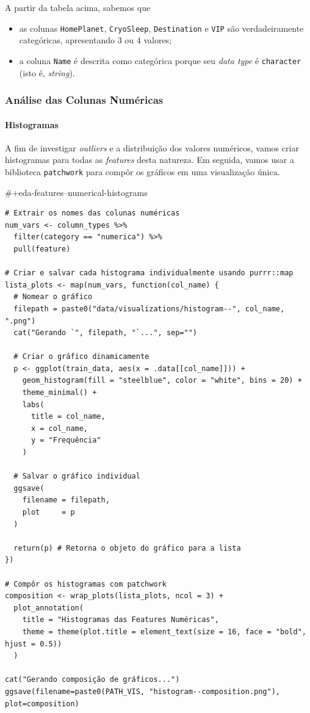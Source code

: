 \documentclass[12pt,a4paper]{article}
\begin{document}
A partir da tabela acima, sabemos que
\begin{itemize}
\item as colunas \texttt{HomePlanet}, \texttt{CryoSleep}, \texttt{Destination} e \texttt{VIP} são verdadeiramente categóricas, apresentando \(3\) ou \(4\) valores;
\item a coluna \texttt{Name} é descrita como categórica porque seu \emph{data type} é \texttt{character} (isto é, \emph{string}).
\end{itemize}
\subsubsection{Análise das Colunas Numéricas}
\label{sec:orgc41321d}
\paragraph{Histogramas}
\label{sec:orgdb3da68}
A fim de investigar \emph{outliers} e a distribuição dos valores numéricos, vamos criar histogramas para todas as \emph{features} desta natureza. Em seguida, vamos usar a biblioteca \texttt{patchwork} para compôr os gráficos em uma visualização única.

\#+eda-features--numerical-histograms
\begin{verbatim}
# Extrair os nomes das colunas numéricas
num_vars <- column_types %>% 
  filter(category == "numerica") %>% 
  pull(feature)

# Criar e salvar cada histograma individualmente usando purrr::map
lista_plots <- map(num_vars, function(col_name) {
  # Nomear o gráfico
  filepath = paste0("data/visualizations/histogram--", col_name, ".png")
  cat("Gerando `", filepath, "`...", sep="")

  # Criar o gráfico dinamicamente
  p <- ggplot(train_data, aes(x = .data[[col_name]])) +
    geom_histogram(fill = "steelblue", color = "white", bins = 20) +
    theme_minimal() +
    labs(
      title = col_name,
      x = col_name,
      y = "Frequência"
    )

  # Salvar o gráfico individual
  ggsave(
    filename = filepath,
    plot     = p
  )

  return(p) # Retorna o objeto do gráfico para a lista
})

# Compôr os histogramas com patchwork
composition <- wrap_plots(lista_plots, ncol = 3) + 
  plot_annotation(
    title = "Histogramas das Features Numéricas",
    theme = theme(plot.title = element_text(size = 16, face = "bold", hjust = 0.5))
  )

cat("Gerando composição de gráficos...")
ggsave(filename=paste0(PATH_VIS, "histogram--composition.png"), plot=composition)
\end{verbatim}
\end{document}
